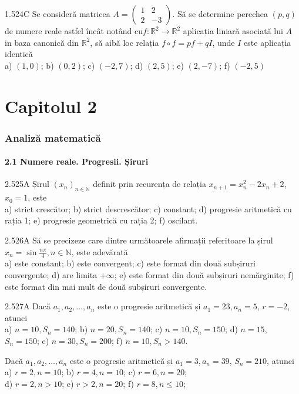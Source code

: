 \documentclass[11pt]{article}
\begin{document}
1.524C Se consideră matricea $A=\left(\begin{array}{cc}1 & 2 \\ 2 & -3\end{array}\right)$. Să se determine perechea $(p, q)$ de numere reale astfel încât notând $\mathrm{cu} f: \mathbb{R}^{2} \rightarrow \mathbb{R}^{2}$ aplicația liniară asociată lui $A$ in baza canonică din $\mathbb{R}^{2}$, să aibă loc relația $f \circ f=p f+q I$, unde $I$ este aplicația identică\\ a) $(1,0)$; b) $(0,2)$; c) $(-2,7)$; d) $(2,5)$; e) $(2,-7)$; f) $(-2,5)$

\part*{Capitolul 2}
\section*{Analiză matematică}
\subsection*{2.1 Numere reale. Progresii. Șiruri}
2.525A Șirul $\left(x_{n}\right)_{n \in \mathbb{N}}$ definit prin recurența de relația $x_{n+1}=x_{n}^{2}-2 x_{n}+2$, $x_{0}=1$, este\\ a) strict crescător; b) strict descrescător; c) constant; d) progresie aritmetică cu rația 1; e) progresie geometrică cu rația 2; f) oscilant.

2.526A Să se precizeze care dintre următoarele afirmații referitoare la șirul $x_{n}=\sin \frac{n \pi}{4}, n \in \mathbb{N}$, este adevărată\\ a) este constant; b) este convergent; c) este format din două subșiruri convergente; d) are limita $+\infty$; e) este format din două subșiruri nemărginite; f) este format din mai mult de două subșiruri convergente.

2.527A Dacă $a_{1}, a_{2}, \ldots, a_{n}$ este o progresie aritmetică și $a_{1}=23, a_{n}=5$, $r=-2$, atunci\\ a) $n=10, S_{n}=140$; b) $n=20, S_{n}=140$; c) $n=10, S_{n}=150$; d) $n=15$, $S_{n}=150$; e) $n=30, S_{n}=200$; f) $n=10, S_{n}>140$.

Dacă $a_{1}, a_{2}, \ldots, a_{n}$ este o progresie aritmetică și $a_{1}=3, a_{n}=39$, $S_{n}=210$, atunci\\ a) $r=2, n=10$; b) $r=4, n=10$; c) $r=6, n=20$;\\ d) $r=2, n>10$; e) $r>2, n=20$; f) $r=8, n \leq 10$;
\end{document}
